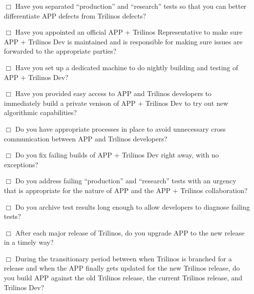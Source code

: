 \documentclass[pdf,ps2pdf,11pt]{SANDreport}
\begin{document}
$\Box$ Have you separated ``production'' and ``research'' tests so that you
can better differentiate APP defects from Trilinos defects?

$\Box$ Have you appointed an official APP + Trilinos Representative to make
sure APP + Trilinos Dev is maintained and is responsible for making sure
issues are forwarded to the appropriate parties?

$\Box$ Have you set up a dedicated machine to do nightly building and testing
of APP + Trilinos Dev?

$\Box$ Have you provided easy access to APP and Trilinos developers to
immediately build a private venison of APP + Trilinos Dev to try out new
algorithmic capabilities?

$\Box$ Do you have appropriate processes in place to avoid unnecessary cross
communication between APP and Trilinos developers?

$\Box$ Do you fix failing builds of APP + Trilinos Dev right away, with no
exceptions?

$\Box$ Do you address failing ``production'' and ``research'' tests with an
urgency that is appropriate for the nature of APP and the APP + Trilinos
collaboration?

$\Box$ Do you archive test results long enough to allow developers to diagnose
failing tests?

$\Box$ After each major release of Trilinos, do you upgrade APP to the new
release in a timely way?

$\Box$ During the transitionary period between when Trilinos is branched for a
release and when the APP finally gets updated for the new Trilinos release, do
you build APP against the old Trilinos release, the current Trilinos release,
and Trilinos Dev?


\end{document}
